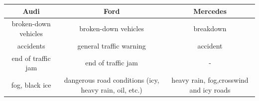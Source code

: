 \documentclass[
]{book}
\begin{document}
\begin{longtable}[]{@{}ccc@{}}
\toprule
\begin{minipage}[b]{0.30\columnwidth}\centering
Audi\strut
\end{minipage} & \begin{minipage}[b]{0.30\columnwidth}\centering
Ford\strut
\end{minipage} & \begin{minipage}[b]{0.30\columnwidth}\centering
Mercedes\strut
\end{minipage}\tabularnewline
\midrule
\endhead
\begin{minipage}[t]{0.30\columnwidth}\centering
broken-down vehicles\strut
\end{minipage} & \begin{minipage}[t]{0.30\columnwidth}\centering
broken-down vehicles\strut
\end{minipage} & \begin{minipage}[t]{0.30\columnwidth}\centering
breakdown\strut
\end{minipage}\tabularnewline
\begin{minipage}[t]{0.30\columnwidth}\centering
accidents\strut
\end{minipage} & \begin{minipage}[t]{0.30\columnwidth}\centering
general traffic warning\strut
\end{minipage} & \begin{minipage}[t]{0.30\columnwidth}\centering
accident\strut
\end{minipage}\tabularnewline
\begin{minipage}[t]{0.30\columnwidth}\centering
end of traffic jam\strut
\end{minipage} & \begin{minipage}[t]{0.30\columnwidth}\centering
end of traffic jam\strut
\end{minipage} & \begin{minipage}[t]{0.30\columnwidth}\centering
-\strut
\end{minipage}\tabularnewline
\begin{minipage}[t]{0.30\columnwidth}\centering
fog, black ice\strut
\end{minipage} & \begin{minipage}[t]{0.30\columnwidth}\centering
dangerous road conditions (icy, heavy rain, oil, etc.)\strut
\end{minipage} & \begin{minipage}[t]{0.30\columnwidth}\centering
heavy rain, fog,crosswind and icy roads\strut

\end{minipage}
\end{longtable}
\end{document}
